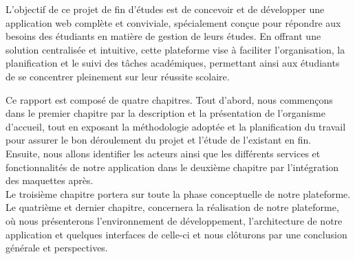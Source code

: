 \vspace{2mm}
L'objectif de ce projet de fin d'études est de concevoir et de développer une application web complète et conviviale, spécialement conçue pour répondre aux besoins des étudiants en matière de gestion de leurs études. En offrant une solution centralisée et intuitive, cette plateforme vise à faciliter l'organisation, la planification et le suivi des tâches académiques, permettant ainsi aux étudiants de se concentrer pleinement sur leur réussite scolaire.
\par
\vspace{2mm}
Ce rapport est composé de quatre chapitres. Tout d’abord, nous commençons dans le premier chapitre par la description et la présentation de l’organisme d’accueil, tout en exposant la méthodologie adoptée et la planification du travail pour assurer le bon déroulement du projet et l'étude de l'existant en fin.\\ Ensuite, nous allons identifier les acteurs ainsi que les différents services et fonctionnalités de notre application dans le deuxième chapitre par l'intégration des maquettes
après.\\ Le troisième chapitre portera sur toute la phase conceptuelle de notre plateforme.\\ Le quatrième et dernier chapitre, concernera la réalisation de notre plateforme, où nous présenterons l’environnement de développement, l’architecture de notre application et quelques interfaces de celle-ci et nous clôturons par une conclusion générale et perspectives.











\medskip





















